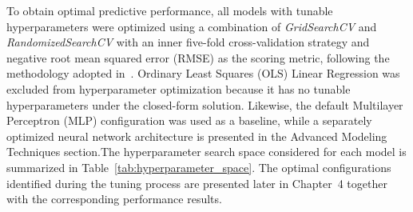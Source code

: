 To obtain optimal predictive performance, all models with tunable hyperparameters were optimized using a combination of \textit{GridSearchCV} and \textit{RandomizedSearchCV} with an inner five-fold cross-validation strategy and negative root mean squared error (RMSE) as the scoring metric, following the methodology adopted in~\cite{atique2026explainable}. Ordinary Least Squares (OLS) Linear Regression was excluded from hyperparameter optimization because it has no tunable hyperparameters under the closed-form solution. Likewise, the default Multilayer Perceptron (MLP) configuration was used as a baseline, while a separately optimized neural network architecture is presented in the Advanced Modeling Techniques section.The hyperparameter search space considered for each model is summarized in Table~\ref{tab:hyperparameter_space}\cite{atique2026explainable}. The optimal configurations identified during the tuning process are presented later in Chapter~4 together with the corresponding performance results.

